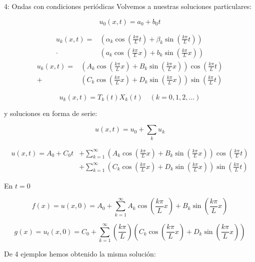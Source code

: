 \begin{example}{4: Ondas con condiciones periódicas}
			Volvemos a nuestras soluciones particulares:

			\[u_0(x,t) = a_0 + b_0t\]


			\begin{align*}
			u_k(x,t) = &\left(\alpha_k \cos \left( \frac{k \pi}{L} t \right) + \beta_k \sin \left( \frac{k \pi}{L} t \right) \right) \\
			\cdot &\left(a_k \cos \left( \frac{k \pi}{L} x \right) + b_k \sin \left( \frac{k \pi}{L} x \right) \right)
			\end{align*}
			\begin{align*}
			u_k(x,t) = &\left(A_k \cos \left( \frac{k \pi}{L} x \right) + B_k \sin \left( \frac{k \pi}{L} x \right) \right) \cos \left( \frac{k \pi}{L} t \right)\\
			+ &\left(C_k \cos \left( \frac{k \pi}{L} x \right) + D_k \sin \left( \frac{k \pi}{L} x \right) \right) \sin \left( \frac{k \pi}{L} t \right)
			\end{align*}




			\[u_k(x,t) = T_k(t) X_k(t) \quad (k=0,1,2,…)\]


			y soluciones en forma de serie:

			\[ u(x,t) = u_0 + \sum_k u_k \]

			\begin{align*}
				u(x,t) = A_0 + C_0 t &+ \sum^{\infty}_{k=1} \left(A_k \cos \left( \frac{k \pi}{L} x \right) + B_k \sin \left( \frac{k \pi}{L} x \right) \right) \cos \left( \frac{k \pi}{L} t \right)\\
				&+ \sum^{\infty}_{k=1} \left(C_k \cos \left( \frac{k \pi}{L} x \right) + D_k \sin \left( \frac{k \pi}{L} x \right) \right) \sin \left( \frac{k \pi}{L} t \right)
			\end{align*}

			En $t = 0$

			\[f(x) = u(x,0) = A_0 + \sum_{k=1}^{\infty} A_k \cos \left( \frac{k \pi}{L} x \right) + B_k \sin \left( \frac{k \pi}{L} x \right) \]

			\[g(x) = u_t (x,0) = C_0 + \sum_{k=1}^{\infty} \left(\frac{k \pi}{L}\right) \left( C_k \cos \left( \frac{k \pi}{L} x \right) + D_k \sin \left( \frac{k \pi}{L} x \right)\right) \]


		\end{example}

		De 4 ejemplos hemos obtenido la misma solución:

